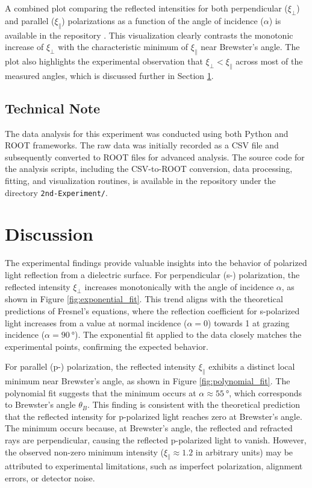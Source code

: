 \documentclass[journal]{IEEEtran}
\begin{document}
A combined plot comparing the reflected intensities for both perpendicular ($\xi_{\perp}$) and parallel ($\xi_{\parallel}$) polarizations as a function of the angle of incidence ($\alpha$) is available in the repository \cite{github}. This visualization clearly contrasts the monotonic increase of $\xi_{\perp}$ with the characteristic minimum of $\xi_{\parallel}$ near Brewster's angle. The plot also highlights the experimental observation that $\xi_{\perp} < \xi_{\parallel}$ across most of the measured angles, which is discussed further in Section \ref{sec:discussion}.

\subsection{Technical Note}
The data analysis for this experiment was conducted using both Python and ROOT frameworks. The raw data was initially recorded as a CSV file and subsequently converted to ROOT files for advanced analysis. The source code for the analysis scripts, including the CSV-to-ROOT conversion, data processing, fitting, and visualization routines, is available in the repository under the directory \texttt{2nd-Experiment/}.

\section{Discussion}
\label{sec:discussion}
The experimental findings provide valuable insights into the behavior of polarized light reflection from a dielectric surface. 
For perpendicular (s-) polarization, the reflected intensity $\xi_{\perp}$ increases monotonically with the angle of incidence $\alpha$, as shown in Figure \ref{fig:exponential_fit}. This trend aligns with the theoretical predictions of Fresnel's equations, where the reflection coefficient for s-polarized light increases from a value at normal incidence ($\alpha=0$) towards 1 at grazing incidence ($\alpha=\SI{90}{\degree}$). The exponential fit applied to the data closely matches the experimental points, confirming the expected behavior.

For parallel (p-) polarization, the reflected intensity $\xi_{\parallel}$ exhibits a distinct local minimum near Brewster's angle, as shown in Figure \ref{fig:polynomial_fit}. The polynomial fit suggests that the minimum occurs at $\alpha \approx \SI{55}{\degree}$, which corresponds to Brewster's angle $\theta_B$. This finding is consistent with the theoretical prediction that the reflected intensity for p-polarized light reaches zero at Brewster's angle. The minimum occurs because, at Brewster's angle, the reflected and refracted rays are perpendicular, causing the reflected p-polarized light to vanish. However, the observed non-zero minimum intensity ($\xi_{\parallel} \approx 1.2$ in arbitrary units) may be attributed to experimental limitations, such as imperfect polarization, alignment errors, or detector noise.
\end{document}
